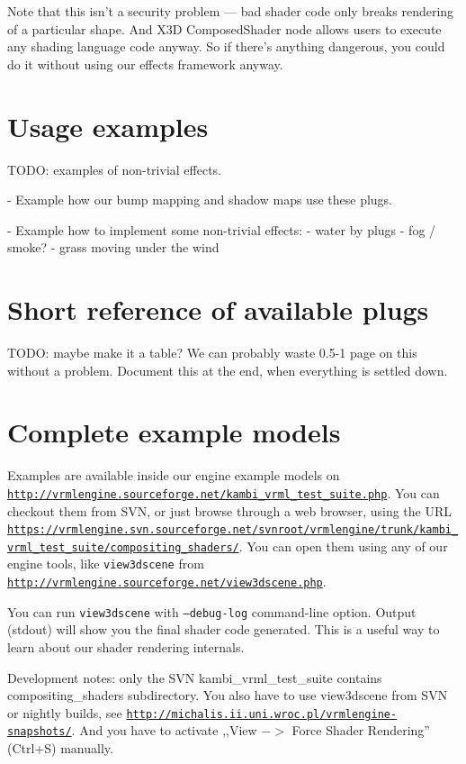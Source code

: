 \documentclass{acmsiggraph}                     %
\newcommand*{\myhref}[2]{\texttt{\href{#1}{\nolinkurl{#2}}}}
\begin{document}
Note that this isn't a security problem --- bad shader code only breaks
rendering of a particular shape. And X3D ComposedShader node allows users
to execute any shading language code anyway. So if there's anything dangerous,
you could do it without using our effects framework anyway.

\section{Usage examples}

TODO: examples of non-trivial effects.

- Example how our bump mapping and shadow maps use these plugs.

- Example how to implement some non-trivial effects:
  - water by plugs
  - fog / smoke?
  - grass moving under the wind

\section{Short reference of available plugs}

TODO: maybe make it a table? We can probably waste 0.5-1 page on this
without a problem. Document this at the end, when everything is settled down.

\section{Complete example models}

Examples are available inside our engine example models on
\myhref{http://vrmlengine.sourceforge.net/kambi\_vrml\_test\_suite.php}{http://vrmlengine.sourceforge.net/kambi_vrml_test_suite.php}.
You can checkout them from SVN, or just browse through a web browser,
using the URL
\myhref{https://vrmlengine.svn.sourceforge.net/svnroot/vrmlengine/trunk/kambi\_vrml\_test\_suite/compositing\_shaders/}{https://vrmlengine.svn.sourceforge.net/svnroot/vrmlengine/trunk/kambi_vrml_test_suite/compositing_shaders/}.
You can open them using any of our engine tools,
like \texttt{view3dscene} from
\myhref{http://vrmlengine.sourceforge.net/view3dscene.php}{http://vrmlengine.sourceforge.net/view3dscene.php}.

You can run \texttt{view3dscene} with \texttt{--debug-log} command-line
option. Output (stdout) will show you the final shader code generated.
This is a useful way to learn about our shader rendering internals.

Development notes: only the SVN kambi\_vrml\_test\_suite contains
compositing\_shaders subdirectory.
You also have to use view3dscene from SVN or nightly builds,
see \myhref{http://michalis.ii.uni.wroc.pl/vrmlengine-snapshots/}{http://michalis.ii.uni.wroc.pl/vrmlengine-snapshots/}.
And you have to activate ,,View $->$ Force Shader Rendering'' (Ctrl+S) manually.


\nocite{*}

\end{document}
